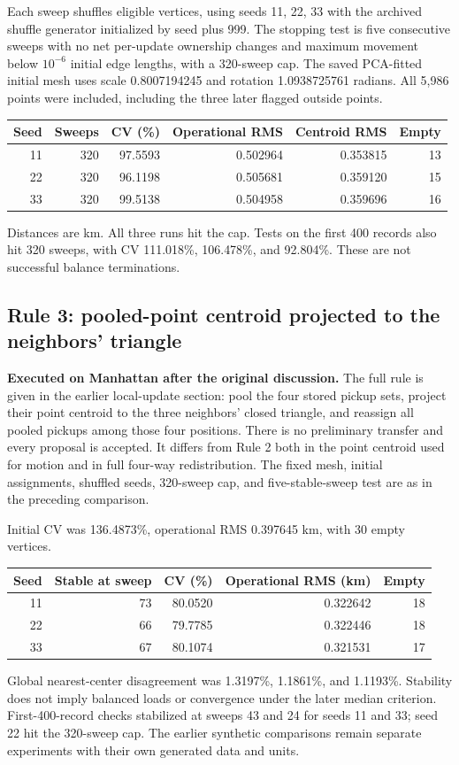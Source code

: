 \documentclass[11pt]{article}
\begin{document}
Each sweep shuffles eligible vertices, using seeds 11, 22, 33 with the archived
shuffle generator initialized by seed plus 999. The stopping test is five
consecutive sweeps with no net per-update ownership changes and maximum movement
below $10^{-6}$ initial edge lengths, with a 320-sweep cap. The saved PCA-fitted
initial mesh uses scale 0.8007194245 and rotation 1.0938725761 radians.
All 5,986 points were included, including the three later flagged outside points.

\begin{center}\begin{tabular}{rrrrrr}
\toprule Seed & Sweeps & CV (\%) & Operational RMS & Centroid RMS & Empty\\\midrule
11&320&97.5593&0.502964&0.353815&13\\
22&320&96.1198&0.505681&0.359120&15\\
33&320&99.5138&0.504958&0.359696&16\\\bottomrule
\end{tabular}\end{center}
Distances are km. All three runs hit the cap. Tests on the first 400 records
also hit 320 sweeps, with CV 111.018\%, 106.478\%, and 92.804\%.
These are not successful balance terminations.

\subsection{Rule 3: pooled-point centroid projected to the neighbors' triangle}
\textbf{Executed on Manhattan after the original discussion.}
The full rule is given in the earlier local-update section: pool the four stored
pickup sets, project their point centroid to the three neighbors' closed
triangle, and reassign all pooled pickups among those four positions. There is
no preliminary transfer and every proposal is accepted. It differs from Rule 2
both in the point centroid used for motion and in full four-way redistribution.
The fixed mesh, initial assignments, shuffled seeds, 320-sweep cap, and
five-stable-sweep test are as in the preceding comparison.

Initial CV was 136.4873\%, operational RMS 0.397645 km, with 30 empty vertices.
\begin{center}\begin{tabular}{rrrrr}
\toprule Seed & Stable at sweep & CV (\%) & Operational RMS (km) & Empty\\\midrule
11&73&80.0520&0.322642&18\\
22&66&79.7785&0.322446&18\\
33&67&80.1074&0.321531&17\\\bottomrule
\end{tabular}\end{center}
Global nearest-center disagreement was 1.3197\%, 1.1861\%, and 1.1193\%.
Stability does not imply balanced loads or convergence under the later median
criterion. First-400-record checks stabilized at sweeps 43 and 24 for seeds 11
and 33; seed 22 hit the 320-sweep cap. The earlier synthetic comparisons remain
separate experiments with their own generated data and units.
\end{document}
